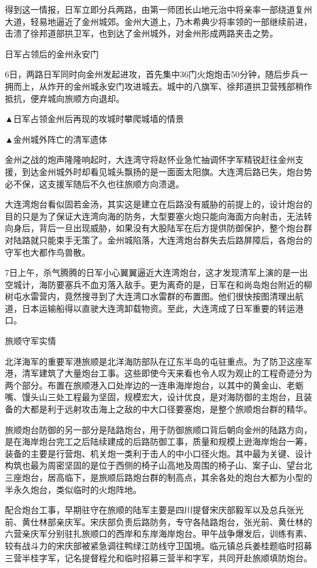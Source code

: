 \documentclass[12pt,UTF8]{ctexbook}
\begin{document}
得到这一情报，日军立即分兵两路，由第一师团长山地元治中将亲率一部绕道复州大道，轻易地逼近了金州城郊。金州大道上，乃木希典少将率领的一部继续前进，击溃了徐邦道部拱卫军，也到达了金州城外，对金州形成两路夹击之势。


日军占领后的金州永安门

6日，两路日军同时向金州发起进攻，首先集中36门火炮炮击50分钟，随后步兵一拥而上，从炸开的金州城永安门攻进城去。城中的八旗军、徐邦道拱卫营残部稍作抵抗，便弃城向旅顺方向退却。


▲日军占领金州后再现的攻城时攀爬城墙的情景


▲金州城外阵亡的清军遗体

金州之战的炮声隆隆响起时，大连湾守将赵怀业急忙抽调怀字军精锐赶往金州支援，到达金州城外时却看见城头飘扬的是一面面太阳旗。大连湾后路已失，炮台势必不保，这支援军随后不久也往旅顺方向溃退。

大连湾炮台看似固若金汤，其实这是建立在后路没有威胁的前提上的，设计炮台的目的只是为了保证大连湾向海的防务，大型要塞火炮只能向海面方向射击，无法转向身后，背后一旦出现威胁，如果没有大股陆军在后方提供防御保护，整个炮台群对陆路就只能束手无策了。金州城陷落，大连湾炮台群失去后路屏障后，各炮台的守军也大都作鸟兽散。

7日上午，杀气腾腾的日军小心翼翼逼近大连湾炮台，这才发现清军上演的是一出空城计，海防要塞兵不血刃落入敌手。更为离奇的是，日军在和尚岛炮台附近的柳树屯水雷营内，竟然搜寻到了大连湾口水雷群的布置图。他们很快按图清理出航道，日本运输船得以直驶大连湾卸载物资。至此，大连湾成了日军重要的转运港口。

旅顺守军实情

北洋海军的重要军港旅顺是北洋海防部队在辽东半岛的屯驻重点。为了防卫这座军港，清军建筑了大量炮台工事。这些即使今天来看也令人叹为观止的工程奇迹分为两个部分。布置在旅顺港入口处岸边的一连串海岸炮台，以其中的黄金山、老蛎嘴、馒头山三处工程最为坚固，规模宏大，设计优良，是对海防御的主炮台，且装备的大都是利于远射攻击海上之敌的中大口径要塞炮，是整个旅顺炮台群的精华。

旅顺炮台防御的另一部分是陆路炮台，用于防御旅顺口背后朝向金州的陆路方向，是在海岸炮台完工之后陆续建成的后路防御工事，质量和规模上逊海岸炮台一筹，装备的主要是行营炮、机关炮一类利于击人的中小口径火炮。其中最为关键、设计构筑也最为周密坚固的是位于西侧的椅子山高地及周围的椅子山、案子山、望台北三座炮台，居高临下，是旅顺后路炮台群的制高点，其余各处的炮台大都为小型的半永久炮台，类似临时的火炮阵地。

配合炮台工事，早期驻守在旅顺的陆军主要是四川提督宋庆部毅军以及总兵张光前、黄仕林部亲庆军。宋庆部负责后路防务，专守各陆路炮台，张光前、黄仕林的六营亲庆军分别驻扎旅顺口的西岸和东岸海岸炮台。甲午战争爆发后，训练有素、较有战斗力的宋庆部被紧急调往鸭绿江防线守卫国境。临元镇总兵姜桂题临时招募三营半桂字军，记名提督程允和临时招募三营半和字军，共同开赴旅顺填防炮台。
\end{document}
